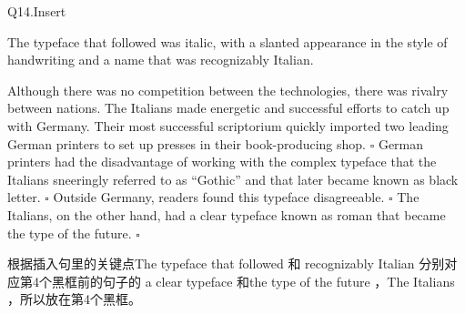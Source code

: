 \begin{blk}
    \begin{qst}
        Q14.Insert

        The typeface that followed was italic, with a slanted appearance in the style of handwriting and a name that was recognizably Italian.
    \end{qst}

    \begin{psgq}
        Although there was no competition between the technologies, there was rivalry between nations. The Italians made energetic and successful efforts to catch up with Germany. Their most successful scriptorium quickly imported two leading German printers to set up presses in their book-producing shop. $\square$ German printers had the disadvantage of working with the complex typeface that the Italians sneeringly referred to as “Gothic” and that later became known as black letter. $\square$ Outside Germany, readers found this typeface disagreeable. $\square$ The Italians, on the other hand, had a clear typeface known as roman that became the type of the future. $\square$
    \end{psgq}

    \begin{nlz}
        根据插入句里的关键点The typeface that followed 和 recognizably Italian 分别对应第4个黑框前的句子的  a clear typeface 和the type of the future ，The Italians ，所以放在第4个黑框。
    \end{nlz}
\end{blk}

